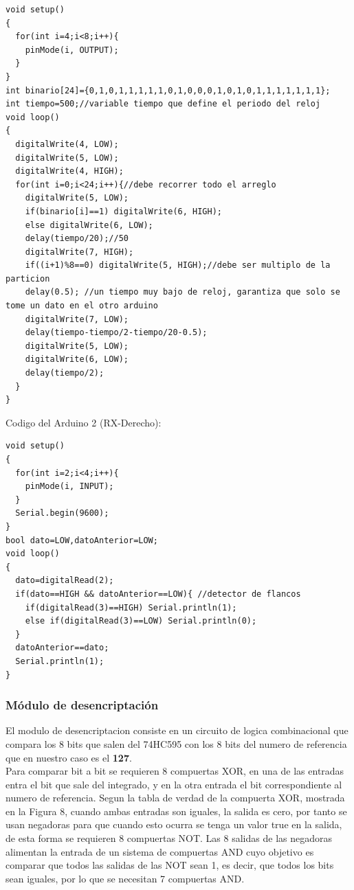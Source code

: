 \documentclass{article}
\begin{document}
\begin{lstlisting}[style=C++]
void setup()
{
  for(int i=4;i<8;i++){
  	pinMode(i, OUTPUT);
  }  
}
int binario[24]={0,1,0,1,1,1,1,1,0,1,0,0,0,1,0,1,0,1,1,1,1,1,1,1};
int tiempo=500;//variable tiempo que define el periodo del reloj
void loop()
{
  digitalWrite(4, LOW);
  digitalWrite(5, LOW);
  digitalWrite(4, HIGH);
  for(int i=0;i<24;i++){//debe recorrer todo el arreglo
    digitalWrite(5, LOW);
    if(binario[i]==1) digitalWrite(6, HIGH);
    else digitalWrite(6, LOW);
    delay(tiempo/20);//50
    digitalWrite(7, HIGH);
    if((i+1)%8==0) digitalWrite(5, HIGH);//debe ser multiplo de la particion
    delay(0.5); //un tiempo muy bajo de reloj, garantiza que solo se tome un dato en el otro arduino
    digitalWrite(7, LOW);
    delay(tiempo-tiempo/2-tiempo/20-0.5);
    digitalWrite(5, LOW);
    digitalWrite(6, LOW);
    delay(tiempo/2); 
  }
}
\end{lstlisting}

\noindent
Codigo del Arduino 2 (RX-Derecho):

\begin{lstlisting}[style=C++]
void setup()
{
  for(int i=2;i<4;i++){
  	pinMode(i, INPUT);
  } 
  Serial.begin(9600);
}
bool dato=LOW,datoAnterior=LOW;
void loop()
{
  dato=digitalRead(2);
  if(dato==HIGH && datoAnterior==LOW){ //detector de flancos
  	if(digitalRead(3)==HIGH) Serial.println(1);
    else if(digitalRead(3)==LOW) Serial.println(0);
  }
  datoAnterior==dato;
  Serial.println(1);
}
\end{lstlisting}

\subsubsection{Módulo de desencriptación}
El modulo de desencriptacion consiste en un circuito de logica combinacional que compara los 8 bits que salen del 74HC595 con los 8 bits del numero de referencia que en nuestro caso es el \textbf{127}.\\

Para comparar bit a bit se requieren 8 compuertas XOR, en una de las entradas entra el bit que sale del integrado, y en la otra entrada el bit correspondiente al numero de referencia. Segun la tabla de verdad de la compuerta XOR, mostrada en la Figura 8, cuando ambas entradas son iguales, la salida es cero, por tanto se usan negadoras para que cuando esto ocurra se tenga un valor true en la salida, de esta forma se requieren 8 compuertas NOT. Las 8 salidas de las negadoras alimentan la entrada de un sistema de compuertas AND cuyo objetivo es comparar que todos las salidas de las NOT sean 1, es decir, que todos los bits sean iguales, por lo que se necesitan 7 compuertas AND.\\
\end{document}
